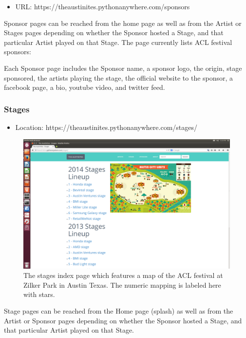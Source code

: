\documentclass[12pt,english]{scrartcl}
\begin{document}
\begin{itemize}
 \item URL: https://theaustinites.pythonanywhere.com/sponsors
\end{itemize}

Sponsor pages can be reached from the home page as well as from the Artist or Stages pages depending on whether the Sponsor hosted a
Stage, and that particular Artist played on that Stage. The page currently lists ACL festival sponsors:

Each Sponsor page includes the Sponsor name, a sponsor logo, the origin, stage sponsored, the artists playing the stage, the official website to the sponsor,
a facebook page, a bio, youtube video, and twitter feed.

\subsubsection{Stages}
\begin{itemize}
 \item Location: https://theaustinites.pythonanywhere.com/stages/
\end{itemize}

\begin{figure}
\includegraphics[width=\textwidth]{stages.png}
 \caption{The stages index page which features a map of the ACL festival at Zilker Park in Austin Texas. The numeric mapping is labeled here with stars.}
\end{figure}

Stage pages can be reached from the Home page (splash) as well as from the Artist or Sponsor pages depending on whether the Sponsor hosted a
Stage, and that particular Artist played on that Stage. 
\end{document}
